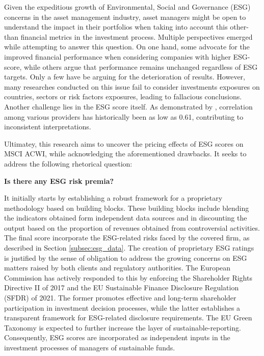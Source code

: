 \documentclass[11pt,a4paper]{article}
\begin{document}
Given the expeditious growth of Environmental, Social and Governance (ESG) concerns in the asset management industry, asset managers might be open to understand the impact in their portfolios when taking into account this other-than financial metrics in the investment process. 
Multiple perspectives emerged while attempting to answer this question. On one hand, some advocate for the improved financial performance when considering companies with higher ESG-score, while others argue that performance remains unchanged regardless of ESG targets. Only a few have be arguing for the deterioration of results. 
However, many researches conducted on this issue fail to consider investments exposures on countries, sectors or  risk factors exposures, leading to fallacious conclusions. 
Another challenge lies in the ESG score itself. As demonstrated by , correlation among various providers has historically been as low as 0.61, contributing to inconsistent interpretations. 

Ultimatey, this research aims to uncover the pricing effects of  ESG scores on MSCI ACWI,  while acknowledging the aforementioned drawbacks. It seeks to address the following rhetorical question:

\medskip
\centerline{\textbf{Is there any ESG risk premia?}}
\medskip

It initially starts by establishing a robust framework for a proprietary methodology based on building blocks. 
These building blocks include blending the indicators obtained form independent data sources and in discounting the output based on the proportion of revenues obtained from controversial activities. 
The final score incorporate the ESG-related risks faced by the covered firm, as described in Section \ref{subsec:esg_data}.
The creation of proprietary ESG ratings is justified by the sense of obligation to address the growing concerns on ESG matters raised by both clients and regulatory authorities. 
The European Commission has actively responded to this by enforcing the Shareholder Rights Directive II of 2017 and the EU Sustainable Finance Disclosure Regulation (SFDR) of 2021. 
The former promotes effective and long-term shareholder participation in investment decision processes, while the latter establishes a transparent framework for ESG-related disclosure requirements.
The EU Green Taxonomy is expected to further increase the layer of sustainable-reporting. 
Consequently, ESG scores are  incorporated as independent inputs in the investment processes of managers of sustainable funds. 
\end{document}
